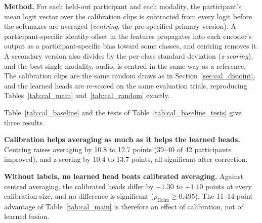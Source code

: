 \textbf{Method.} For each held-out participant and each modality, the participant's
mean logit vector over the calibration clips is subtracted from every logit before the
softmaxes are averaged (\emph{centring}, the pre-specified primary version). A
participant-specific identity offset in the features propagates into each encoder's
output as a participant-specific bias toward some classes, and centring removes it.
A secondary version also divides by the per-class standard deviation (\emph{z-scoring}),
and the best single modality, audio, is centred in the same way as a reference. The
calibration clips are the same random draws as in Section~\ref{sec:cal_disjoint}, and
the learned heads are re-scored on the same evaluation trials, reproducing
Tables~\ref{tab:cal_main} and~\ref{tab:cal_random} exactly.

\begin{table}[htbp]
\centering
\small
\caption{Calibrated averaging against the calibrated learned heads, 42 participants.
All columns except the first use the same calibration clips and are scored on the
same trials.}
\label{tab:cal_baseline}
\end{table}

Table~\ref{tab:cal_baseline} and the tests of Table~\ref{tab:cal_baseline_tests} give
three results.

\textbf{Calibration helps averaging as much as it helps the learned heads.} Centring
raises averaging by 10.8 to 12.7 points (39--40 of 42 participants improved), and
z-scoring by 10.4 to 13.7 points, all significant after correction.

\textbf{Without labels, no learned head beats calibrated averaging.} Against centred
averaging, the calibrated heads differ by $-1.30$ to $+1.10$ points at every
calibration size, and no difference is significant ($p_{\mathrm{Holm}} \ge 0.495$).
The 11--14-point advantage of Table~\ref{tab:cal_main} is therefore an effect of
calibration, not of learned fusion.

